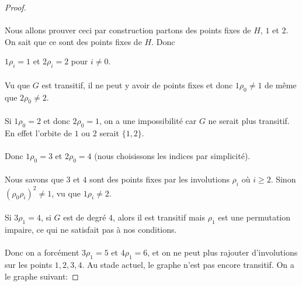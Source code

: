 \documentclass[a4paper]{article}
\theoremstyle{mytheorem}
\begin{document}
\begin{proof}
  \item
  \paragraph{}
  Nous allons prouver ceci par construction partons des points fixes de $H$, $1$ et $2$. On sait que ce sont des points fixes de $H$. Donc
  \begin{center}
    $1 \rho_i = 1$ et $2 \rho_i = 2$ pour $i \neq 0$.
  \end{center}

  \paragraph{}
  Vu que $G$ est transitif, il ne peut y avoir de points fixes et donc $1 \rho_0 \neq 1$ de même que $2 \rho_0 \neq 2$.

  \paragraph{}
  Si $ 1 \rho_0 = 2$ et donc $2 \rho_0 = 1$, on a une impossibilité car $G$ ne serait plus transitif. En effet l'orbite de $1$ ou $2$ serait $\{1,2\}$.

  \paragraph{}
  Donc $1 \rho_0 = 3$ et $2 \rho_0 = 4$ (nous choisissons les indices par simplicité).

  \paragraph{}
  Nous savons que $3$ et $4$ sont des points fixes par les involutions $\rho_i$ où $i \ge 2$. Sinon $(\rho_0\rho_i)^2 \neq 1$, vu que $1 \rho_i \neq 2$.

  \paragraph{}
  Si $3 \rho_1  = 4$, si $G$ est de degré $4$, alors il est transitif mais $\rho_1$ est une permutation impaire, ce qui ne satisfait pas à nos conditions.

  \paragraph{}
  Donc on a forcément $3 \rho_1 = 5$ et $4 \rho_1 = 6$, et on ne peut plus rajouter d'involutions sur les points $1, 2, 3, 4$. Au stade actuel, le graphe n'est pas encore transitif. On a le graphe suivant:


\end{proof}
\end{document}
